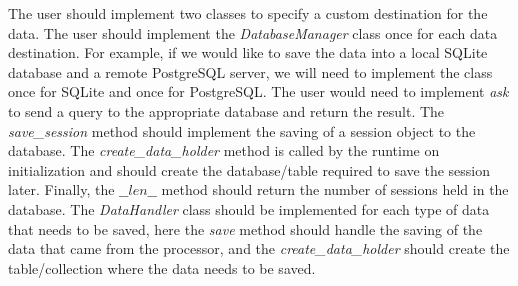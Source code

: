 \documentclass[../main.tex]{subfiles}
\begin{document}
\begin{itemize}
\begin{lstlisting}[language=Python]
        \end{lstlisting}
        The user should implement two classes to specify a custom destination for the data. The user should implement the \textit{DatabaseManager} 
        class once for each data destination. For example, if we would like to save the data into a local SQLite database and a remote PostgreSQL server, 
        we will need to implement the class once for SQLite and once for PostgreSQL. 
        The user would need to implement \textit{ask} to send a query to the appropriate database and return the result.
        The \textit{save\_session} method should implement the saving of a session object to the database.
        The \textit{create\_data\_holder} method is called by the runtime on initialization and should create the database/table required to save the session later.
        Finally, the $\_\_len\_\_$ method should return the number of sessions held in the database. 
        The \textit{DataHandler} class should be implemented for each type of data that needs to be saved, here the \textit{save} method should handle the 
        saving of the data that came from the processor, and the \textit{create\_data\_holder} should create the table/collection where the data needs to be saved.

 \end{itemize}

 \newpage
\end{document}
